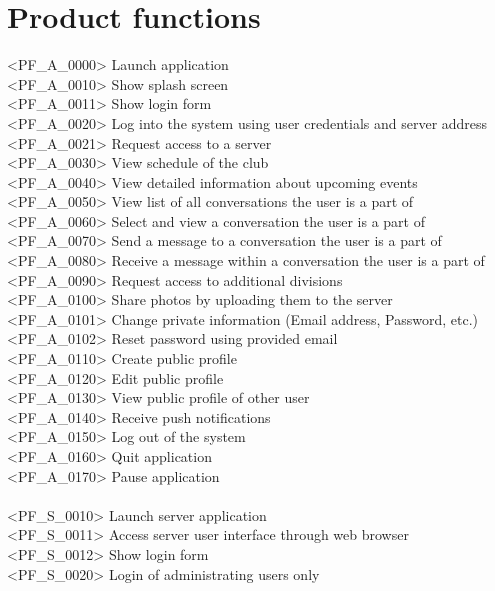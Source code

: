\chapter{Product functions}
<PF\_A\_0000> Launch application \\
<PF\_A\_0010> Show splash screen \\
<PF\_A\_0011> Show login form \\ 
<PF\_A\_0020> Log into the system using user credentials and server address \\
<PF\_A\_0021> Request access to a server \\
<PF\_A\_0030> View schedule of the club \\
<PF\_A\_0040> View detailed information about upcoming events \\
<PF\_A\_0050> View list of all conversations the user is a part of \\
<PF\_A\_0060> Select and view a conversation the user is a part of \\
<PF\_A\_0070> Send a message to a conversation the user is a part of \\
<PF\_A\_0080> Receive a message within a conversation the user is a part of \\
<PF\_A\_0090> Request access to additional divisions \\
<PF\_A\_0100> Share photos by uploading them to the server \\
<PF\_A\_0101> Change private information (Email address, Password, etc.) \\
<PF\_A\_0102> Reset password using provided email \\
<PF\_A\_0110> Create public profile \\
<PF\_A\_0120> Edit public profile \\
<PF\_A\_0130> View public profile of other user \\
<PF\_A\_0140> Receive push notifications \\
<PF\_A\_0150> Log out of the system \\
<PF\_A\_0160> Quit application \\
<PF\_A\_0170> Pause application \\
\\
<PF\_S\_0010> Launch server application \\
<PF\_S\_0011> Access server user interface through web browser \\
<PF\_S\_0012> Show login form \\
<PF\_S\_0020> Login of administrating users only \\
